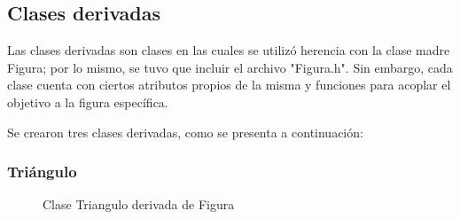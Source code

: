\documentclass[11pt]{article}
\begin{document}
\newpage
\subsection{Clases derivadas}

Las clases derivadas son clases en las cuales se utilizó herencia con la clase madre Figura; por lo mismo, se tuvo que incluir el archivo "Figura.h". Sin embargo, cada clase cuenta con ciertos atributos propios de la misma y funciones para acoplar el objetivo a la figura específica. 

Se crearon tres clases derivadas, como se presenta a continuación:

\subsubsection{Triángulo}

\begin{figure}[H]
\centering
{}
\caption{Clase Triangulo derivada de Figura}
\label{fig:tri}
\end{figure}
\end{document}
